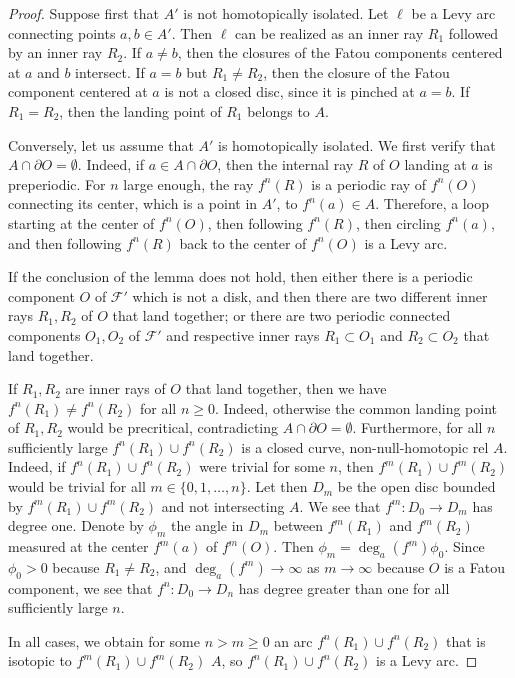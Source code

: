 \documentclass{amsart}
\newcommand\Fatou{{\mathcal F}}
\begin{document}
\begin{proof}
  Suppose first that $A'$ is not homotopically isolated. Let $\ell$ be
  a Levy arc connecting points $a,b\in A'$. Then $\ell$ can be
  realized as an inner ray $R_1$ followed by an inner ray $R_2$. If
  $a\not= b$, then the closures of the Fatou components centered at
  $a$ and $b$ intersect. If $a=b$ but $R_1\not=R_2$, then the closure
  of the Fatou component centered at $a$ is not a closed disc, since
  it is pinched at $a=b$. If $R_1=R_2$, then the landing point of
  $R_1$ belongs to $A$.

  Conversely, let us assume that $A'$ is homotopically isolated. We
  first verify that $A\cap\partial O=\emptyset$. Indeed, if
  $a\in A\cap\partial O$, then the internal ray $R$ of $O$ landing at
  $a$ is preperiodic. For $n$ large enough, the ray $f^n(R)$ is a
  periodic ray of $f^n(O)$ connecting its center, which is a point in
  $A'$, to $f^n(a)\in A$. Therefore, a loop starting at the center of
  $f^n(O)$, then following $f^n(R)$, then circling $f^n(a)$, and then
  following $f^n(R)$ back to the center of $f^n(O)$ is a Levy arc.

  If the conclusion of the lemma does not hold, then either there is a
  periodic component $O$ of $\Fatou'$ which is not a disk, and then
  there are two different inner rays $R_1,R_2$ of $O$ that land
  together; or there are two periodic connected components $O_1,O_2$
  of $\Fatou'$ and respective inner rays $R_1\subset O_1$ and
  $R_2\subset O_2$ that land together.

  If $R_1,R_2$ are inner rays of $O$ that land together, then we have
  $f^n(R_1)\neq f^n(R_2) $ for all $n\ge 0$. Indeed, otherwise the
  common landing point of $R_1,R_2$ would be precritical,
  contradicting $A\cap\partial O=\emptyset$. Furthermore, for all
  $n$ sufficiently large $f^n(R_1)\cup f^n(R_2) $ is a closed curve,
  non-null-homotopic rel $A$. Indeed, if $f^n(R_1)\cup f^n(R_2) $ were
  trivial for some $n$, then $f^m(R_1)\cup f^m(R_2)$ would be trivial
  for all $m\in \{0,1,\dots, n\}$. Let then $D_m$ be the open disc
  bounded by $f^m(R_1)\cup f^m(R_2) $ and not intersecting $A$.  We
  see that $f^m\colon D_0\to D_m $ has degree one. Denote by $\phi_m$
  the angle in $D_m$ between $f^m(R_1)$ and $f^m(R_2)$ measured at the
  center $f^m(a)$ of $f^m(O)$. Then $\phi_m=\deg_a(f^m)\phi_0$. Since
  $\phi_0>0$ because $R_1\neq R_2$, and $\deg_a(f^m)\to\infty$ as
  $m\to\infty$ because $O$ is a Fatou component, we see that
  $f^{n}\colon D_0\to D_n$ has degree greater than one for all
  sufficiently large $n$.

  In all cases, we obtain for some $n>m \ge0$ an arc
  $f^n(R_1)\cup f^n(R_2)$ that is isotopic to $f^m(R_1)\cup f^m(R_2)$
  $A$, so $f^n(R_1)\cup f^n(R_2)$ is a Levy arc.
\end{proof}
\end{document}
